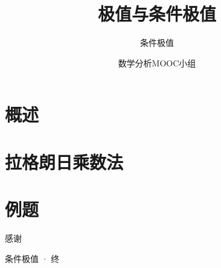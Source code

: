\documentclass[xetex, aspectratio=169]{beamer}
\title{极值与条件极值}
\subtitle{条件极值}
\author{数学分析MOOC小组}
\date{}
\begin{document}
    \frame{\maketitle}

    \section{概述}
    
    \section{拉格朗日乘数法}
    
    \section{例题}
    
    

    \begin{frame}[standout]

        感谢

        \small{条件极值 · 终}
    
    \end{frame}
\end{document}
